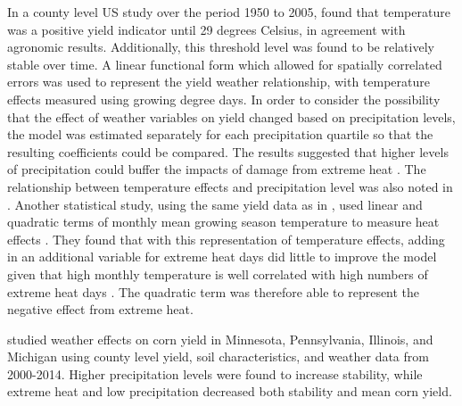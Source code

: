 In a county level US study over the period 1950 to 2005, \cite{schlenker2009nonlinear} found that temperature was a positive yield indicator until 29 degrees Celsius, in agreement with agronomic results. Additionally, this threshold level was found to be relatively stable over time. A linear functional form which allowed for spatially correlated errors was used to represent the yield weather relationship, with temperature effects measured using growing degree days. In order to consider the possibility that the effect of weather variables on yield changed based on precipitation levels, the model was estimated separately for each precipitation quartile so that the resulting coefficients could be compared. The results suggested that higher levels of precipitation could buffer the impacts of damage from extreme heat \citep{schlenker2009nonlinear}. The relationship between temperature effects and precipitation level was also noted in \citep{hansen1991farmer}. Another statistical study, using the same yield data as in \cite{schlenker2009nonlinear}, used linear and quadratic terms of monthly mean growing season temperature to measure heat effects \citep{urban2012projected}. They found that with this representation of temperature effects, adding in an additional variable for extreme heat days did little to improve the model given that high monthly temperature is well correlated with high numbers of extreme heat days \citep{urban2012projected}. The quadratic term was therefore able to represent the negative effect from extreme heat.

\cite{williams2016soil} studied weather effects on corn yield in Minnesota, Pennsylvania, Illinois, and Michigan using county level yield, soil characteristics, and weather data from 2000-2014. Higher precipitation levels were found to increase stability, while extreme heat and low precipitation decreased both stability and mean corn yield.

